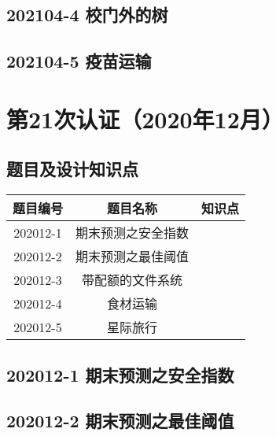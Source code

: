 \documentclass[cn,10pt,math=newtx,citestyle=gb7714-2015,bibstyle=gb7714-2015]{elegantbook}
\newif\ifonlyanalyze %
\begin{document}
\newpage
\section{202104-4 校门外的树}
\ifonlyanalyze
\else
  
\fi


\newpage
\section{202104-5 疫苗运输}
\ifonlyanalyze
\else
  
\fi



\chapter{第21次认证（2020年12月）}

\section{题目及设计知识点}

\begin{table}[htbp]
  \centering
  \begin{tabular}{ccc}
    \toprule
    题目编号 & 题目名称           & 知识点 \\
    \midrule
    202012-1 & 期末预测之安全指数 &        \\
    202012-2 & 期末预测之最佳阈值 &        \\
    202012-3 & 带配额的文件系统   &        \\
    202012-4 & 食材运输           &        \\
    202012-5 & 星际旅行           &        \\
    \bottomrule
  \end{tabular}
\end{table}

\newpage
\section{202012-1 期末预测之安全指数}
\ifonlyanalyze
\else
  
\fi


\newpage
\section{202012-2 期末预测之最佳阈值}
\ifonlyanalyze
\else
  
\fi

\end{document}
